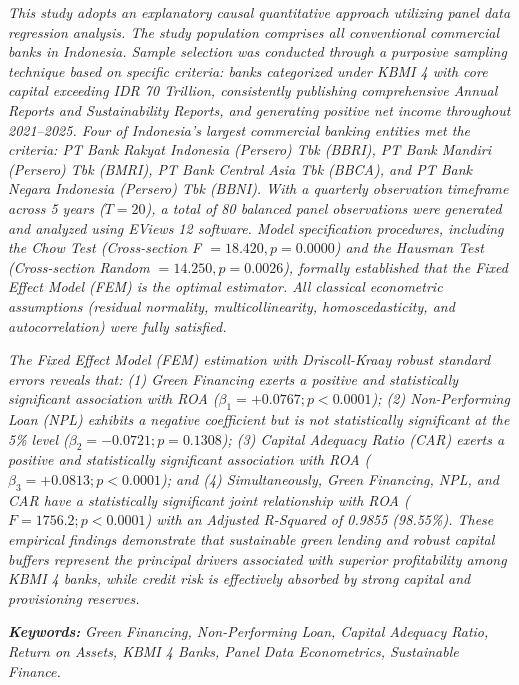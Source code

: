 \documentclass[12pt,a4paper]{article}
\numberwithin{equation}{section}
\begin{document}
\noindent
\emph{This study adopts an explanatory causal quantitative approach utilizing panel data regression analysis. The study population comprises all conventional commercial banks in Indonesia. Sample selection was conducted through a purposive sampling technique based on specific criteria: banks categorized under KBMI 4 with core capital exceeding IDR 70 Trillion, consistently publishing comprehensive Annual Reports and Sustainability Reports, and generating positive net income throughout 2021--2025. Four of Indonesia's largest commercial banking entities met the criteria: PT Bank Rakyat Indonesia (Persero) Tbk (BBRI), PT Bank Mandiri (Persero) Tbk (BMRI), PT Bank Central Asia Tbk (BBCA), and PT Bank Negara Indonesia (Persero) Tbk (BBNI). With a quarterly observation timeframe across 5 years ($T=20$), a total of 80 balanced panel observations were generated and analyzed using EViews 12 software. Model specification procedures, including the Chow Test (Cross-section F $= 18.420, p = 0.0000$) and the Hausman Test (Cross-section Random $= 14.250, p = 0.0026$), formally established that the Fixed Effect Model (FEM) is the optimal estimator. All classical econometric assumptions (residual normality, multicollinearity, homoscedasticity, and autocorrelation) were fully satisfied.}

\noindent
\emph{The Fixed Effect Model (FEM) estimation with Driscoll-Kraay robust standard errors reveals that: (1) Green Financing exerts a positive and statistically significant association with ROA ($\beta_1 = +0.0767; p < 0.0001$); (2) Non-Performing Loan (NPL) exhibits a negative coefficient but is not statistically significant at the 5\% level ($\beta_2 = -0.0721; p = 0.1308$); (3) Capital Adequacy Ratio (CAR) exerts a positive and statistically significant association with ROA ($\beta_3 = +0.0813; p < 0.0001$); and (4) Simultaneously, Green Financing, NPL, and CAR have a statistically significant joint relationship with ROA ($F = 1756.2; p < 0.0001$) with an Adjusted R-Squared of 0.9855 (98.55\%). These empirical findings demonstrate that sustainable green lending and robust capital buffers represent the principal drivers associated with superior profitability among KBMI 4 banks, while credit risk is effectively absorbed by strong capital and provisioning reserves.}

\vspace{0.4cm}
\noindent
\textbf{\emph{Keywords:}} \emph{Green Financing, Non-Performing Loan, Capital Adequacy Ratio, Return on Assets, KBMI 4 Banks, Panel Data Econometrics, Sustainable Finance.}
\end{document}
